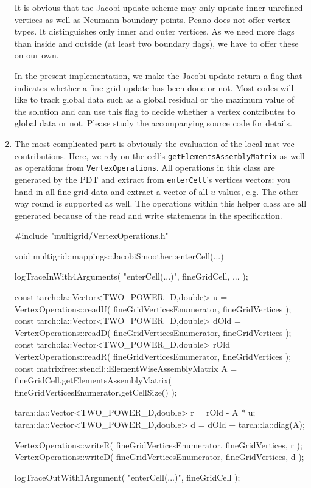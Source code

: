 \begin{enumerate}
    \begin{remark}
    It is obvious that the Jacobi update scheme may only update inner
    unrefined vertices as well as Neumann boundary points. Peano does not offer
    vertex types. It distinguishes only inner and outer vertices. As we need
    more flags than inside and outside (at least two boundary
    flags), we have to offer these on our own\footnotemark .
    \end{remark}
    
    
    In the present implementation, we make the Jacobi update return a flag that
    indicates whether a fine grid update has been done or not. 
    Most codes will like to track global data such as a global residual or the
    maximum value of the solution and can use this flag to decide whether a
    vertex contributes to global data or not. Please study the accompanying
    source code for details.
    
    \item The most complicated part is obviously the evaluation of the local
    mat-vec contributions. Here, we rely on the cell's
    \texttt{getElementsAssemblyMatrix} as well as operations from \newline
    \texttt{VertexOperations}. All operations in this class are generated by the
    PDT and extract from \texttt{enterCell}'s vertices vectors: you hand in all
    fine grid data and extract a vector of all $u$ values, e.g. The other way
    round is supported as well. The operations within this helper class are all
    generated because of the read and write statements in the specification. 
    \begin{code}
#include "multigrid/VertexOperations.h"

void multigrid::mappings::JacobiSmoother::enterCell(...) {
  logTraceInWith4Arguments( "enterCell(...)", fineGridCell, ... );

  const tarch::la::Vector<TWO_POWER_D,double> u    =
    VertexOperations::readU( fineGridVerticesEnumerator, fineGridVertices );
  const tarch::la::Vector<TWO_POWER_D,double> dOld    =
    VertexOperations::readD( fineGridVerticesEnumerator, fineGridVertices );
  const tarch::la::Vector<TWO_POWER_D,double> rOld =
    VertexOperations::readR( fineGridVerticesEnumerator, fineGridVertices );
  const matrixfree::stencil::ElementWiseAssemblyMatrix A =
    fineGridCell.getElementsAssemblyMatrix( fineGridVerticesEnumerator.getCellSize() );

  tarch::la::Vector<TWO_POWER_D,double> r = rOld - A * u;
  tarch::la::Vector<TWO_POWER_D,double> d = dOld + tarch::la::diag(A);

  VertexOperations::writeR( fineGridVerticesEnumerator, fineGridVertices, r );
  VertexOperations::writeD( fineGridVerticesEnumerator, fineGridVertices, d );

  logTraceOutWith1Argument( "enterCell(...)", fineGridCell );
}
    \end{code}
\end{enumerate}



